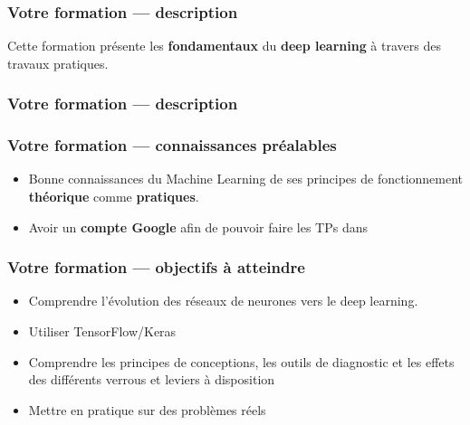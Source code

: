 
\begin{frame}
  \frametitle{Votre formation — description}
  Cette formation présente les \textbf{fondamentaux} du \textbf{deep learning} à travers des travaux pratiques. \\
\end{frame}

\begin{frame}
  \frametitle{Votre formation — description}
\end{frame}

\begin{frame}
  \frametitle{Votre formation — connaissances préalables}
  \begin{itemize}
  \item Bonne connaissances du Machine Learning de ses principes de fonctionnement \textbf{théorique} comme \textbf{pratiques}. 
  \item Avoir un \textbf{compte Google} afin de pouvoir faire les TPs dans 
  \end{itemize}
\end{frame}

\begin{frame}
  \frametitle{Votre formation — objectifs à atteindre}
  \begin{itemize}
  \item Comprendre l'évolution des réseaux de neurones vers le deep learning.
  \item Utiliser TensorFlow/Keras
  \item Comprendre les principes de conceptions, les outils de diagnostic et les effets des différents verrous et leviers à disposition
  \item Mettre en pratique sur des problèmes réels
  \end{itemize}
\end{frame}

